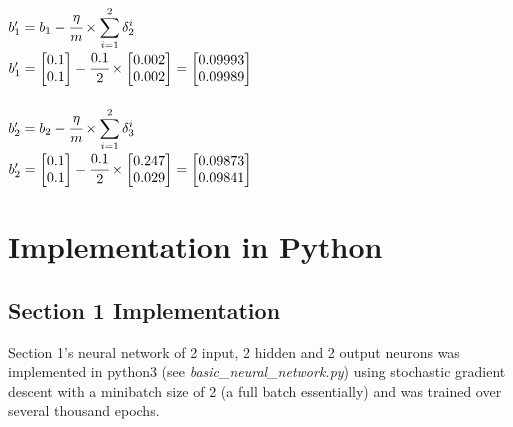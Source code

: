 \documentclass{article}
\begin{document}
\\$b_1^\prime = b_1 - \cfrac{\eta}{m} \times \displaystyle\sum_{i=1}^{2} \delta_2^i$
\\$b_1^\prime = 
\begin{bmatrix}
0.1 \\ 0.1 \\
\end{bmatrix} - \cfrac{0.1}{2} \times
\begin{bmatrix}
0.002 \\ 0.002 \\
\end{bmatrix} = 
\begin{bmatrix}
0.09993 \\ 0.09989 \\
\end{bmatrix}$\\
\\$b_2^\prime = b_2 - \cfrac{\eta}{m} \times \displaystyle\sum_{i=1}^{2} \delta_3^i$
\\$b_2^\prime = 
\begin{bmatrix}
0.1 \\ 0.1 \\
\end{bmatrix} - \cfrac{0.1}{2} \times
\begin{bmatrix}
0.247 \\ 0.029 \\
\end{bmatrix} = 
\begin{bmatrix}
0.09873 \\ 0.09841
\end{bmatrix}$\\
\clearpage

\section{Implementation in Python}
\subsection{Section 1 Implementation}
Section 1's neural network of 2 input, 2 hidden and 2 output neurons was implemented in python3 (see \textit{basic\_neural\_network.py}) using stochastic gradient descent with a minibatch size of 2 (a full batch essentially) and was trained over several thousand epochs.\\
\end{document}
